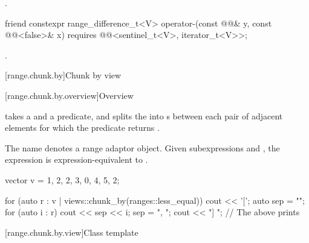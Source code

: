 \begin{itemdescr}
\pnum
\returns
{}.
\end{itemdescr}

\begin{itemdecl}
friend constexpr range_difference_t<V>
  operator-(const @@& y, const @@<false>& x)
    requires @@<sentinel_t<V>, iterator_t<V>>;
\end{itemdecl}

\begin{itemdescr}
\pnum
\returns
{}.
\end{itemdescr}

[range.chunk.by]{Chunk by view}

[range.chunk.by.overview]{Overview}

\pnum
{} takes a  and a predicate, and
splits the  into s
between each pair of adjacent elements
for which the predicate returns .

\pnum
{}%
The name  denotes
a range adaptor object.
Given subexpressions  and ,
the expression  is expression-equivalent to
.
\begin{example}
\begin{codeblock}
vector v = {1, 2, 2, 3, 0, 4, 5, 2};

for (auto r : v | views::chunk_by(ranges::less_equal{})) {
  cout << '[';
  auto sep = "";
  for (auto i : r) {
    cout << sep << i;
    sep = ", ";
  }
  cout << "] ";
}
// The above prints \tcode{[1, 2, 2, 3] [0, 4, 5] [2]}
\end{codeblock}
\end{example}

[range.chunk.by.view]{Class template }

